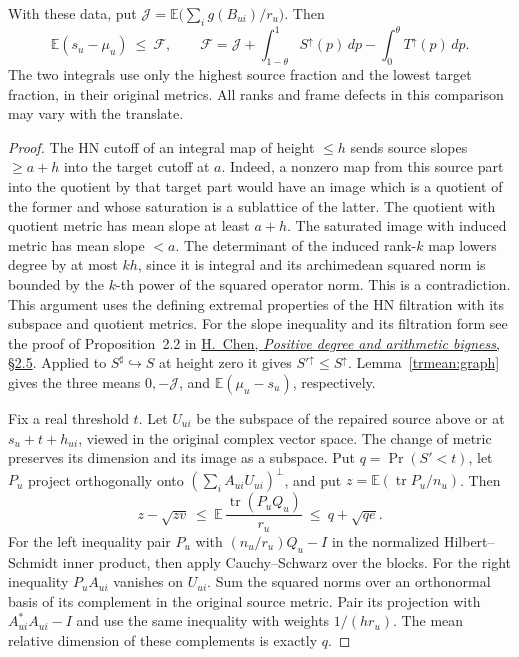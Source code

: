 \begin{theorem}\label{trmean:trace}
With these data, put
\(\mathcal J=\mathbb E\big(\sum_i g(B_{ui})/r_u\big)\). Then
\begin{equation}\label{trmean:gap}
 \mathbb E(s_u-\mu_u)\ \le\ \mathcal F,\qquad
 \mathcal F=\mathcal J+\int_{1-\theta}^1 S^\uparrow(p)\,dp
                         -\int_0^\theta T^\uparrow(p)\,dp .
\end{equation}
The two integrals use only the highest source fraction and the lowest
target fraction, in their original metrics. All ranks and frame
defects in this comparison may vary with the translate.
\end{theorem}
\begin{proof}
The HN cutoff of an integral map of height \(\le h\) sends source
slopes \(\ge a+h\) into the target cutoff at \(a\). Indeed, a nonzero
map from this source part into the quotient by that target part
would have an image which is a quotient of the former and whose
saturation is a sublattice of the latter. The quotient with quotient
metric has mean slope at least \(a+h\). The saturated image with
induced metric has mean slope \(<a\). The determinant of the induced
rank-\(k\) map lowers degree by at most \(kh\), since it is integral
and its archimedean squared norm is bounded by the \(k\)-th power of
the squared operator norm. This is a contradiction. This argument
uses the defining extremal properties of the HN filtration with its
subspace and quotient metrics. For the slope inequality and its
filtration form see the proof of Proposition~2.2 in
\href{https://arxiv.org/pdf/0803.2583}{H.~Chen, \emph{Positive degree and arithmetic bigness},
\S2.5}. Applied to \(S^\sharp\hookrightarrow S\)
at height zero it gives \(S'^\uparrow\le S^\uparrow\).
Lemma~\ref{trmean:graph} gives the three means \(0,-\mathcal J\),
and \(\mathbb E(\mu_u-s_u)\), respectively.

Fix a real threshold \(t\). Let \(U_{ui}\) be the subspace of the
repaired source above or at \(s_u+t+h_{ui}\), viewed in the original
complex vector space. The change of metric preserves its dimension
and its image as a subspace. Put \(q=\Pr(S'<t)\), let \(P_u\) project
orthogonally onto \((\sum_i A_{ui}U_{ui})^\perp\), and put
\(z=\mathbb E(\operatorname{tr}P_u/n_u)\). Then
\[
 z-\sqrt{zv}\ \le\ \mathbb E\,\frac{\operatorname{tr}(P_uQ_u)}{r_u}
                     \ \le\ q+\sqrt{qe}.
\]
For the left inequality pair \(P_u\) with \((n_u/r_u)Q_u-I\) in
the normalized Hilbert--Schmidt inner product, then apply
Cauchy--Schwarz over the blocks. For the right inequality
\(P_u A_{ui}\) vanishes on \(U_{ui}\). Sum the squared norms over
an orthonormal basis of its complement in the original source metric.
Pair its projection with \(A_{ui}^*A_{ui}-I\) and use the same
inequality with weights \(1/(h r_u)\). The mean relative dimension
of these complements is exactly \(q\).


\end{proof}

